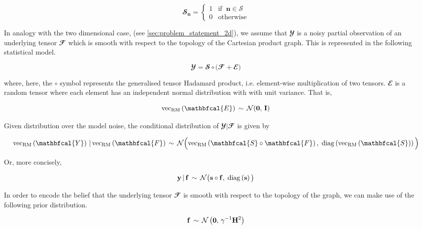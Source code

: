 \begin{equation}
    \mathbfcal{S}_{\mathbf{n}} = \begin{cases}
        1 & \text{if} \;\; \mathbf{n} \in \mathcal{S} \\
        0 & \text{otherwise}
    \end{cases}
\end{equation}

In analogy with the two dimensional case, (see \cref{sec:problem_statement_2d}), we assume that $\mathbfcal{Y}$ is a noisy partial observation of an underlying tensor $\mathbfcal{F}$ which is smooth with respect to the topology of the Cartesian product graph. This is represented in the following statistical model. 

\begin{equation}
    \mathbfcal{Y} = \mathbfcal{S} \circ \big(\mathbfcal{F} + \mathbfcal{E} \big)
\end{equation}

where, here, the $\circ$ symbol represents the generalised tensor Hadamard product, i.e. element-wise multiplication of two tensors. $\mathbfcal{E}$ is a random tensor where each element has an independent normal distribution with with unit variance. That is,

\begin{equation}
    \vecrm{\mathbfcal{E}} \, \sim \, \mathcal{N}(\mathbf{0}, \, \I)
\end{equation}

Given distribution over the model noise, the conditional distribution of $\mathbfcal{Y} |  \mathbfcal{F}$ is given by 

\begin{equation}
    \vecrm{\mathbfcal{Y}} \, | \, \vecrm{\mathbfcal{F}} \, \sim \, \mathcal{N}\Big(\vecrm{\mathbfcal{S} \circ \mathbfcal{F}}, \; \diag{\vecrm{\mathbfcal{S}}}\Big)
\end{equation}

Or, more concisely, 

\begin{equation}
    \mathbf{y} \, | \, \mathbf{f} \, \sim \, \mathcal{N}\big(\mathbf{s} \circ \mathbf{f}, \; \text{\textup{diag}}\left(\mathbf{s}\right)\big)
\end{equation}

In order to encode the belief that the underlying tensor $\mathbfcal{F}$ is smooth with respect to the topology of the graph, we can make use of the following prior distribution. 

\begin{equation}
    \mathbf{f} \, \sim \, \mathcal{N}\left( \mathbf{0}, \, \gamma^{-1} \mathbf{H}^2 \right) 
\end{equation}

